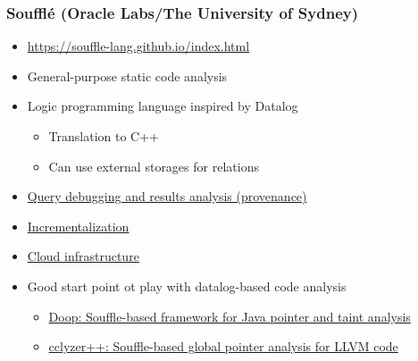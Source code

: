 \documentclass[xcolor=table,aspectratio=169]{beamer}
\begin{document}
\begin{frame}[fragile]
  \frametitle{Souffl\'e (Oracle Labs/The University of Sydney)} 
  \begin{minipage}[t]{0.48\textwidth}
  \begin{itemize}
    \item \url{https://souffle-lang.github.io/index.html}
    \item General-purpose static code analysis
    \item Logic programming language inspired by Datalog
    \begin{itemize}
      \item Translation to C++
      \item Can use external storages for relations
    \end{itemize}
  \end{itemize}
  \end{minipage}
    \pause
    \begin{minipage}[t]{0.48\textwidth}
      \begin{itemize}
    \item[\faGears] \href{https://souffle-lang.github.io/pdf/toplas20.pdf}{Query debugging and results analysis (provenance)}
    \item[\faGears] \href{https://dl.acm.org/doi/10.1145/3479394.3479415}{Incrementalization}
    \item[\faGears] \href{https://ses.library.usyd.edu.au/handle/2123/25800}{Cloud infrastructure}
  \end{itemize}  
\end{minipage}
\vfill
\pause
  \begin{itemize}
    \item Good start point ot play with datalog-based code analysis
    \begin{itemize}
      \item \href{https://github.com/ShiftLeftSecurity/llvm2cpg}{Doop: Souffle-based framework for Java pointer and taint analysis}
      \item \href{https://galoisinc.github.io/cclyzerpp/}{cclyzer++: Souffle-based global pointer analysis for LLVM code}
    \end{itemize}  
  \end{itemize}  
\end{frame}
\end{document}
